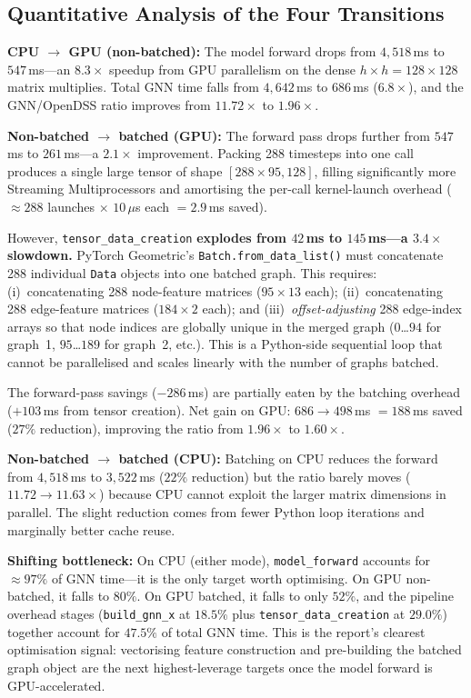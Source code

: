\documentclass[11pt]{article}
\begin{document}
\subsection{Quantitative Analysis of the Four Transitions}

\textbf{CPU $\to$ GPU (non-batched):}
The model forward drops from $4{,}518$\,ms to $547$\,ms---an
$8.3\times$ speedup from GPU parallelism on the dense $h \times h = 128
\times 128$ matrix multiplies.  Total GNN time falls from $4{,}642$\,ms
to $686$\,ms ($6.8\times$), and the GNN/OpenDSS ratio improves from
$11.72\times$ to $1.96\times$.

\textbf{Non-batched $\to$ batched (GPU):}
The forward pass drops further from $547$\,ms to $261$\,ms---a
$2.1\times$ improvement.  Packing 288 timesteps into one call produces a
single large tensor of shape $[288 \times 95, 128]$, filling significantly
more Streaming Multiprocessors and amortising the per-call kernel-launch
overhead (${\approx}288$ launches $\times$ $10\,\mu$s each $= 2.9$\,ms
saved).

However, \texttt{tensor\_data\_creation} \textbf{explodes from $42$\,ms to
$145$\,ms---a $3.4\times$ slowdown.}  PyTorch Geometric's
\texttt{Batch.from\_data\_list()} must concatenate 288 individual
\texttt{Data} objects into one batched graph.  This requires:
(i)~concatenating 288 node-feature matrices ($95 \times 13$ each);
(ii)~concatenating 288 edge-feature matrices ($184 \times 2$ each); and
(iii)~\emph{offset-adjusting} 288 edge-index arrays so that node indices
are globally unique in the merged graph ($0$\ldots$94$ for graph~1,
$95$\ldots$189$ for graph~2, etc.).  This is a Python-side sequential
loop that cannot be parallelised and scales linearly with the number of
graphs batched.

The forward-pass savings ($-286$\,ms) are partially eaten by the batching
overhead ($+103$\,ms from tensor creation).  Net gain on GPU:
$686 \to 498$\,ms $= 188$\,ms saved ($27\%$ reduction), improving the
ratio from $1.96\times$ to $1.60\times$.

\textbf{Non-batched $\to$ batched (CPU):}
Batching on CPU reduces the forward from $4{,}518$\,ms to $3{,}522$\,ms
($22\%$ reduction) but the ratio barely moves ($11.72 \to 11.63\times$)
because CPU cannot exploit the larger matrix dimensions in parallel.  The
slight reduction comes from fewer Python loop iterations and marginally
better cache reuse.

\textbf{Shifting bottleneck:}
On CPU (either mode), \texttt{model\_forward} accounts for ${\approx}97\%$
of GNN time---it is the only target worth optimising.  On GPU non-batched,
it falls to $80\%$.  On GPU batched, it falls to only $52\%$, and the
pipeline overhead stages (\texttt{build\_gnn\_x} at $18.5\%$ plus
\texttt{tensor\_data\_creation} at $29.0\%$) together account for $47.5\%$
of total GNN time.  This is the report's clearest optimisation signal:
vectorising feature construction and pre-building the batched graph object
are the next highest-leverage targets once the model forward is
GPU-accelerated.
\end{document}
